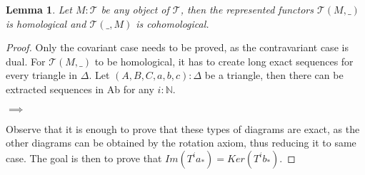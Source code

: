\documentclass[12pt]{article}
\newtheorem{lemma}[theorem]{Lemma}
\theoremstyle{definition}
\theoremstyle{remark}
\begin{document}
            \begin{lemma}
                Let $M:\mathcal{T}$ be any object of $\mathcal{T}$, then the represented functors $\mathcal{T}(M,\_)$ is homological and $\mathcal{T}(\_,M)$ is cohomological.
            \end{lemma}

            \begin{proof}
                Only the covariant case needs to be proved, as the contravariant case is dual. For $\mathcal{T}(M,\_)$ to be homological, it has to create long exact sequences for every triangle in $\Delta$. Let $(A,B,C,a,b,c):\Delta$ be a triangle, then there can be extracted sequences in Ab for any $i:\mathbb{N}$.

                \begin{center}
                     $\implies$
                \end{center}
                Observe that it is enough to prove that these types of diagrams are exact, as the other diagrams can be obtained by the rotation axiom, thus reducing it to same case. The goal is then to prove that $Im(T^ia_*)=Ker(T^ib_*)$.


\end{proof}
\end{document}
